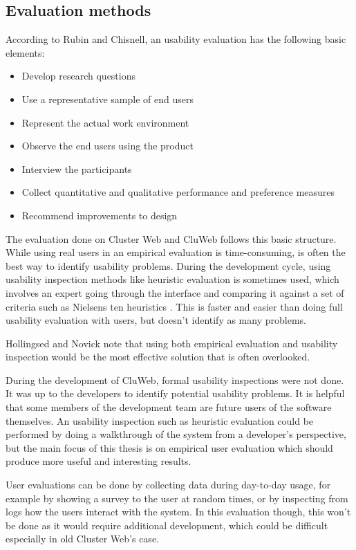 \subsection{Evaluation methods}
According to Rubin and Chisnell, an usability evaluation has the following basic elements:
\begin{itemize}
\item Develop research questions
\item Use a representative sample of end users
\item Represent the actual work environment
\item Observe the end users using the product
\item Interview the participants
\item Collect quantitative and qualitative performance and preference measures
\item Recommend improvements to design
\end{itemize}

\cite{rubin2008handbook}

The evaluation done on Cluster Web and CluWeb follows this basic structure. While using real users in an empirical evaluation is time-consuming, is often the best way to identify usability problems. During the development cycle, using usability inspection methods like heuristic evaluation is sometimes used, which involves an expert going through the interface and comparing it against a set of criteria such as Nielsens ten heuristics \cite{Solr-oula.410573, nielsen1995usability}. This is faster and easier than doing full usability evaluation with users, but doesn't identify as many problems.

Hollingsed and Novick note that using both empirical evaluation and usability inspection would be the most effective solution that is often overlooked. \cite{hollingsed2007usability}

During the development of CluWeb, formal usability inspections were not done. It was up to the developers to identify potential usability problems. It is helpful that some members of the development team are future users of the software themselves. An usability inspection such as heuristic evaluation could be performed by doing a walkthrough of the system from a developer's perspective, but the main focus of this thesis is on empirical user evaluation which should produce more useful and interesting results.

User evaluations can be done by collecting data during day-to-day usage, for example by showing a survey to the user at random times, or by inspecting from logs how the users interact with the system. \cite{bevanevaluation} In this evaluation though, this won't be done as it would require additional development, which could be difficult especially in old Cluster Web's case.

